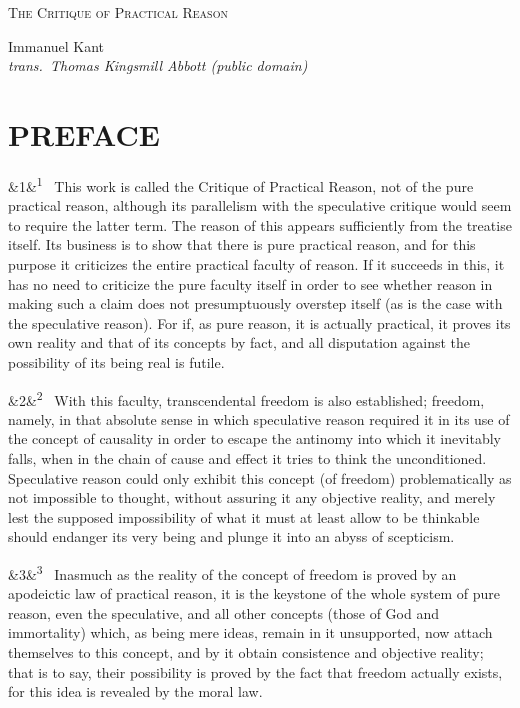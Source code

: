 \documentclass[12pt]{article}
\newcommand{\work}[1]{\begin{center}\LARGE\scshape #1\end{center}}
\newcommand{\attrib}[2]{\begin{center}\large #1\\[2pt]\small\itshape trans.\ #2\end{center}\vspace{1em}}
\newcommand{\para}[1][]{\par\noindent\ifx&#1&\else\textsuperscript{\footnotesize #1}~\fi}
\begin{document}
\work{The Critique of Practical Reason}

\attrib{Immanuel Kant}{Thomas Kingsmill Abbott (public domain)}

\section*{PREFACE}

\para[1] This work is called the Critique of Practical Reason, not of the pure practical reason, although its parallelism with the speculative critique would seem to require the latter term. The reason of this appears sufficiently from the treatise itself. Its business is to show that there is pure practical reason, and for this purpose it criticizes the entire practical faculty of reason. If it succeeds in this, it has no need to criticize the pure faculty itself in order to see whether reason in making such a claim does not presumptuously overstep itself (as is the case with the speculative reason). For if, as pure reason, it is actually practical, it proves its own reality and that of its concepts by fact, and all disputation against the possibility of its being real is futile.

\para[2] With this faculty, transcendental freedom is also established; freedom, namely, in that absolute sense in which speculative reason required it in its use of the concept of causality in order to escape the antinomy into which it inevitably falls, when in the chain of cause and effect it tries to think the unconditioned. Speculative reason could only exhibit this concept (of freedom) problematically as not impossible to thought, without assuring it any objective reality, and merely lest the supposed impossibility of what it must at least allow to be thinkable should endanger its very being and plunge it into an abyss of scepticism.

\para[3] Inasmuch as the reality of the concept of freedom is proved by an apodeictic law of practical reason, it is the keystone of the whole system of pure reason, even the speculative, and all other concepts (those of God and immortality) which, as being mere ideas, remain in it unsupported, now attach themselves to this concept, and by it obtain consistence and objective reality; that is to say, their possibility is proved by the fact that freedom actually exists, for this idea is revealed by the moral law.
\end{document}
